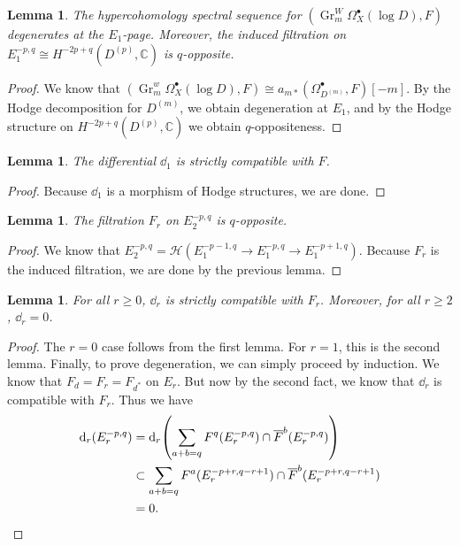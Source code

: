\documentclass[leqno, openany]{memoir}
\newtheorem{lem}[thm]{Lemma}
\theoremstyle{definition}
\theoremstyle{remark}
\theoremstyle{plain}
\theoremstyle{definition}
\theoremstyle{remark}
\newcommand{\C}{\mathbb{C}}
\newcommand{\mc}[1]{\mathcal{#1}}
\newcommand{\on}[1]{\operatorname{#1}}
\newcommand{\ol}[1]{\overline{#1}}
\begin{document}
\begin{lem}
    The hypercohomology spectral sequence for $(\on{Gr}_m^W \Omega_X^{\bullet}(\log D), F)$ degenerates at the $E_1$-page. Moreover, the induced filtration on $E_1^{-p,q} \cong H^{-2p+q}(D^{(p)}, \C)$ is $q$-opposite.
\end{lem}

\begin{proof}
    We know that $(\on{Gr}_m^w \Omega_X^{\bullet}(\log D), F) \cong a_{m*} (\Omega^{\bullet}_{D^{(m)}}, F) [-m]$. By the Hodge decomposition for $D^{(m)}$, we obtain degeneration at $E_1$, and by the Hodge structure on $H^{-2p+q}(D^{(p)}, \C)$ we obtain $q$-oppositeness.
\end{proof}

\begin{lem}
    The differential $\dd_1$ is strictly compatible with $F$.
\end{lem}

\begin{proof}
    Because $\dd_1$ is a morphism of Hodge structures, we are done.
\end{proof}

\begin{lem}
    The filtration $F_r$ on $E_2^{-p, q}$ is $q$-opposite.
\end{lem}

\begin{proof}
    We know that $E_2^{-p, q} = \mc{H}(E_1^{-p-1, q} \to E_1^{-p,q} \to E_1^{-p+1, q})$. Because $F_r$ is the induced filtration, we are done by the previous lemma.
\end{proof}

\begin{lem}
    For all $r \geq 0$, $\dd_r$ is strictly compatible with $F_r$. Moreover, for all $r \geq 2$, $\dd_r = 0$.
\end{lem}

\begin{proof}
    The $r=0$ case follows from the first lemma. For $r=1$, this is the second lemma. Finally, to prove degeneration, we can simply proceed by induction. We know that $F_d = F_r = F_{d^*}$ on $E_r$. But now by the second fact, we know that $\dd_r$ is compatible with $F_r$. Thus we have
    \begin{align*}
        \dd_r(E_r^{-p,q}) &= \dd_r \qty(\sum_{a+b=q} F^q (E_r^{-p,q}) \cap \ol{F}^b(E_r^{-p,q})) \\
        &\subset \sum_{a+b=q} F^a(E_r^{-p+r, q-r+1}) \cap \ol{F}^b (E_r^{-p+r, q-r+1}) \\
        &= 0. \qedhere
    \end{align*}
\end{proof}
\end{document}
